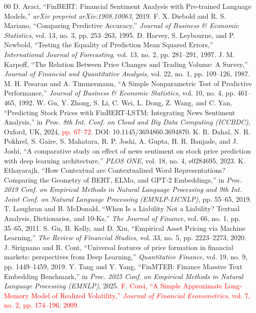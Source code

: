 \documentclass[conference]{IEEEtran}
\newcommand{\novo}[1]{\textcolor{red}{#1}}
\begin{document}
\begin{thebibliography}{00}
 D. Araci, ``FinBERT: Financial Sentiment Analysis with Pre-trained Language Models,'' \emph{arXiv preprint arXiv:1908.10063}, 2019.
 F. X. Diebold and R. S. Mariano, ``Comparing Predictive Accuracy,'' \emph{Journal of Business \& Economic Statistics}, vol. 13, no. 3, pp. 253--263, 1995.
 D. Harvey, S. Leybourne, and P. Newbold, ``Testing the Equality of Prediction Mean Squared Errors,'' \emph{International Journal of Forecasting}, vol. 13, no. 2, pp. 281--291, 1997.
 J. M. Karpoff, ``The Relation Between Price Changes and Trading Volume: A Survey,'' \emph{Journal of Financial and Quantitative Analysis}, vol. 22, no. 1, pp. 109--126, 1987.
 M. H. Pesaran and A. Timmermann, ``A Simple Nonparametric Test of Predictive Performance,'' \emph{Journal of Business \& Economic Statistics}, vol. 10, no. 4, pp. 461--465, 1992.
 W. Gu, Y. Zhong, S. Li, C. Wei, L. Dong, Z. Wang, and C. Yan, ``Predicting Stock Prices with FinBERT-LSTM: Integrating News Sentiment Analysis,'' in \emph{Proc. 8th Int. Conf. on Cloud and Big Data Computing (ICCBDC)}, Oxford, UK, 2024, \novo{pp. 67--72}. DOI: 10.1145/3694860.3694870.
 K. R. Dahal, N. R. Pokhrel, S. Gaire, S. Mahatara, R. P. Joshi, A. Gupta, H. R. Banjade, and J. Joshi, ``A comparative study on effect of news sentiment on stock price prediction with deep learning architecture,'' \emph{PLOS ONE}, vol. 18, no. 4, e0284695, 2023.
 K. Ethayarajh, ``How Contextual are Contextualized Word Representations? Comparing the Geometry of BERT, ELMo, and GPT-2 Embeddings,'' in \emph{Proc. 2019 Conf. on Empirical Methods in Natural Language Processing and 9th Int. Joint Conf. on Natural Language Processing (EMNLP-IJCNLP)}, pp. 55--65, 2019.
 T. Loughran and B. McDonald, ``When Is a Liability Not a Liability? Textual Analysis, Dictionaries, and 10-Ks,'' \emph{The Journal of Finance}, vol. 66, no. 1, pp. 35--65, 2011.
 S. Gu, B. Kelly, and D. Xiu, ``Empirical Asset Pricing via Machine Learning,'' \emph{The Review of Financial Studies}, vol. 33, no. 5, pp. 2223--2273, 2020.
 J. Sirignano and R. Cont, ``Universal features of price formation in financial markets: perspectives from Deep Learning,'' \emph{Quantitative Finance}, vol. 19, no. 9, pp. 1449--1459, 2019.
 Y. Tang and Y. Yang, ``FinMTEB: Finance Massive Text Embedding Benchmark,'' in \emph{Proc. 2025 Conf. on Empirical Methods in Natural Language Processing (EMNLP)}, 2025.
 \novo{F. Corsi, ``A Simple Approximate Long-Memory Model of Realized Volatility,'' \emph{Journal of Financial Econometrics}, vol. 7, no. 2, pp. 174--196, 2009.}
\end{thebibliography}
\end{document}
